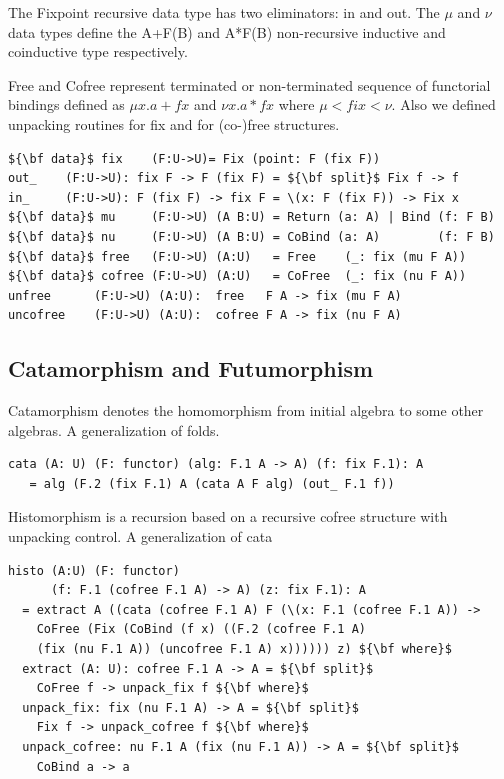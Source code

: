\documentclass{article}
\begin{document}
The Fixpoint recursive data type has two eliminators: in and out.
The $\mu$ and $\nu$ data types define the A+F(B) and A*F(B) non-recursive
inductive and coinductive type respectively.

Free and Cofree represent terminated or non-terminated sequence of functorial
bindings defined as $\mu x . a + f x$ and $\nu x . a * f x$ where $\mu < fix < \nu$.
Also we defined unpacking routines for fix and for (co-)free structures.

\begin{lstlisting}[mathescape=true]
${\bf data}$ fix    (F:U->U)= Fix (point: F (fix F))
out_    (F:U->U): fix F -> F (fix F) = ${\bf split}$ Fix f -> f
in_     (F:U->U): F (fix F) -> fix F = \(x: F (fix F)) -> Fix x
${\bf data}$ mu     (F:U->U) (A B:U) = Return (a: A) | Bind (f: F B)
${\bf data}$ nu     (F:U->U) (A B:U) = CoBind (a: A)        (f: F B)
${\bf data}$ free   (F:U->U) (A:U)   = Free    (_: fix (mu F A))
${\bf data}$ cofree (F:U->U) (A:U)   = CoFree  (_: fix (nu F A))
unfree      (F:U->U) (A:U):  free   F A -> fix (mu F A)
uncofree    (F:U->U) (A:U):  cofree F A -> fix (nu F A)
\end{lstlisting}

\subsection{Catamorphism and Futumorphism}

Catamorphism denotes the homomorphism from initial algebra to some other algebras.
A generalization of folds.

\begin{lstlisting}[mathescape=true]
cata (A: U) (F: functor) (alg: F.1 A -> A) (f: fix F.1): A
   = alg (F.2 (fix F.1) A (cata A F alg) (out_ F.1 f))
\end{lstlisting}

Histomorphism is a recursion based on a recursive cofree structure with unpacking control.
A generalization of cata

\begin{lstlisting}[mathescape=true]
histo (A:U) (F: functor)
      (f: F.1 (cofree F.1 A) -> A) (z: fix F.1): A
  = extract A ((cata (cofree F.1 A) F (\(x: F.1 (cofree F.1 A)) ->
    CoFree (Fix (CoBind (f x) ((F.2 (cofree F.1 A)
    (fix (nu F.1 A)) (uncofree F.1 A) x)))))) z) ${\bf where}$
  extract (A: U): cofree F.1 A -> A = ${\bf split}$
    CoFree f -> unpack_fix f ${\bf where}$
  unpack_fix: fix (nu F.1 A) -> A = ${\bf split}$
    Fix f -> unpack_cofree f ${\bf where}$
  unpack_cofree: nu F.1 A (fix (nu F.1 A)) -> A = ${\bf split}$
    CoBind a -> a
\end{lstlisting}
\end{document}
